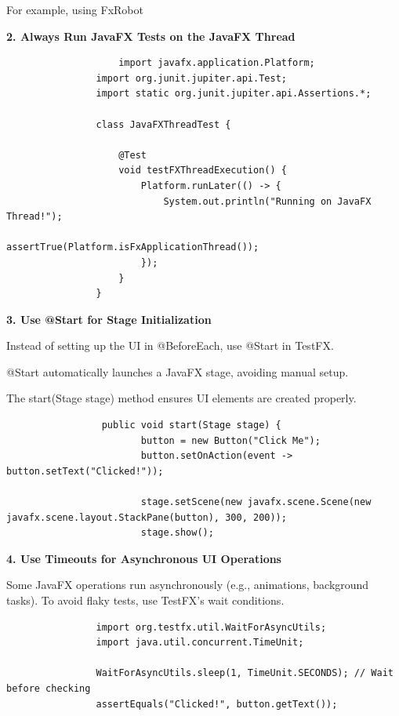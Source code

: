 \documentclass[a4paper]{report}
\begin{document}
For example, using FxRobot
\newpage

\textbf{2. Always Run JavaFX Tests on the JavaFX Thread}
\begin{lstlisting}
                    import javafx.application.Platform;
                import org.junit.jupiter.api.Test;
                import static org.junit.jupiter.api.Assertions.*;
                
                class JavaFXThreadTest {
                
                    @Test
                    void testFXThreadExecution() {
                        Platform.runLater(() -> {
                            System.out.println("Running on JavaFX Thread!");
                            assertTrue(Platform.isFxApplicationThread());
                        });
                    }
                }
\end{lstlisting}

\textbf{3. Use @Start for Stage Initialization}

Instead of setting up the UI in @BeforeEach, use @Start in TestFX.

@Start automatically launches a JavaFX stage, avoiding manual setup.

The start(Stage stage) method ensures UI elements are created properly.

\begin{lstlisting}
                 public void start(Stage stage) {
                        button = new Button("Click Me");
                        button.setOnAction(event -> button.setText("Clicked!"));
                
                        stage.setScene(new javafx.scene.Scene(new javafx.scene.layout.StackPane(button), 300, 200));
                        stage.show();
\end{lstlisting}

\textbf{4. Use Timeouts for Asynchronous UI Operations}

Some JavaFX operations run asynchronously (e.g., animations, background tasks). To avoid flaky tests, use TestFX’s wait conditions.

\begin{lstlisting}
                import org.testfx.util.WaitForAsyncUtils;
                import java.util.concurrent.TimeUnit;
            
                WaitForAsyncUtils.sleep(1, TimeUnit.SECONDS); // Wait before checking
                assertEquals("Clicked!", button.getText());
\end{lstlisting}
\end{document}
